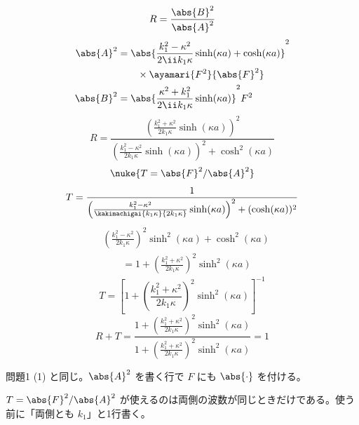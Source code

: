 \[ R=\frac{\abs{B}^{2}}{\abs{A}^{2}} \]
\begin{align*}
\abs{A}^{2}&=\abs{\frac{k_{1}^{2}-\kappa^{2}}{2\ii k_{1}\kappa}\sinh(\kappa a)+\cosh(\kappa a)}^{2}\\
&\qquad\times\ayamari{F^{2}}{\abs{F}^{2}}\\
\abs{B}^{2}&=\abs{\frac{\kappa^{2}+k_{1}^{2}}{2\ii k_{1}\kappa}\sinh(\kappa a)}^{2}F^{2}
\end{align*}
\[ R=\frac{\left(\frac{k_{1}^{2}+\kappa^{2}}{2k_{1}\kappa}\sinh(\kappa a)\right)^{2}}{\left(\frac{k_{1}^{2}-\kappa^{2}}{2k_{1}\kappa}\sinh(\kappa a)\right)^{2}+\cosh^{2}(\kappa a)} \]
\[ \nuke{T=\abs{F}^{2}/\abs{A}^{2}} \]
\[ T=\frac{1}{\left(\frac{k_{1}^{2}-\kappa^{2}}{\kakimachigai{k_{1}\kappa}{2k_{1}\kappa}}\sinh(\kappa a)\right)^{2}+(\cosh(\kappa a))^{2}} \]
\begin{align*}
&\left(\frac{k_{1}^{2}-\kappa^{2}}{2k_{1}\kappa}\right)^{2}\sinh^{2}(\kappa a)+\cosh^{2}(\kappa a)\\
&\qquad=1+\left(\frac{k_{1}^{2}+\kappa^{2}}{2k_{1}\kappa}\right)^{2}\sinh^{2}(\kappa a)
\end{align*}
\[ T=\left[1+\left(\frac{k_{1}^{2}+\kappa^{2}}{2k_{1}\kappa}\right)^{2}\sinh^{2}(\kappa a)\right]^{-1} \]
\[ R+T=\frac{1+\left(\frac{k_{1}^{2}+\kappa^{2}}{2k_{1}\kappa}\right)^{2}\sinh^{2}(\kappa a)}{1+\left(\frac{k_{1}^{2}+\kappa^{2}}{2k_{1}\kappa}\right)^{2}\sinh^{2}(\kappa a)}=1 \]
\item 問題1 (1) と同じ。$\abs{A}^{2}$ を書く行で $F$ にも $\abs{\cdot}$ を付ける。
\item $T=\abs{F}^{2}/\abs{A}^{2}$ が使えるのは両側の波数が同じときだけである。使う前に「両側とも $k_{1}$」と1行書く。
